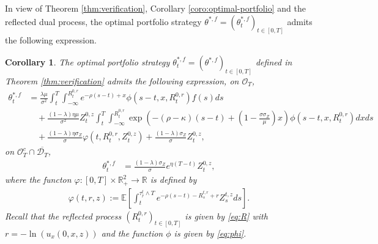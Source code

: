 \documentclass[11pt,times,letter]{article}
\newcommand{\Ex}{ \mathbb{E} }
\newcommand{\R}{\mathds{R}}
\numberwithin{equation}{section}
\newtheorem{corollary}[theorem]{Corollary}
\begin{document}
In view of Theorem \ref{thm:verification}, Corollary \ref{coro:optimal-portfolio} and the reflected dual process, the optimal portfolio strategy $\theta^{*,f}=(\theta_t^{*,f})_{t\in[0,T]}$  admits the following expression.
\begin{corollary}\label{coro:optimal-portfolio-dual}
The optimal portfolio strategy $\theta_t^{*,f}=(\theta^{*,f})_{t\in[0,T]}$ defined in Theorem \ref{thm:verification} admits the following expression,  on $\mathcal{O}_T$,
\begin{align}\label{optimal-portfolio-daul-O}
\theta^{*,f}_t&=\frac{\lambda \mu}{\sigma^2} \int_{t}^{T}\int_{-\infty}^{R_t^{0,r}} e^{-\rho (s-t)+x}\phi(s-t,x,R_t^{0,r})f(s) ds\nonumber\\
&\quad+\frac{(1-\lambda)\eta \mu}{\sigma^2} Z_t^{0,z}\int_{t}^{T}\int_{-\infty}^{R_t^{0,r}} \exp\left(-(\rho-\kappa)(s-t)+\left(1-\frac{\sigma\sigma_Z}{\mu}\right)x\right) \phi(s-t,x,R_t^{0,r})dx ds\nonumber\\
&\quad+\frac{(1-\lambda)\eta\sigma_Z}{\sigma}  \varphi(t,R_t^{0,r},Z_t^{0,z})+\frac{(1-\lambda)\sigma_Z}{\sigma}Z_t^{0,z},
\end{align} 
on $\mathcal{O}_T^c \cap \overline{\mathcal{D}_T}$,
\begin{align}\label{optimal-portfolio-dual-Oc}
\theta^{*,f}_t&=\frac{(1-\lambda)\sigma_Z}{\sigma}e^{\eta (T-t)}Z_t^{0,z},
\end{align}
where the functon $\varphi:[0,T]\times \R_+^2\to \R$ is defined by
\begin{align}\label{eq:varphi}
\varphi(t,r,z):=\Ex\left[ \int_t^{\tau_{\hat{r}}^t \wedge T}e^{-\rho (s-t)-R^{t,r}_s+r}Z_s^{t,z} ds\right].
\end{align}
Recall that the reflected process $(R_t^{0,r})_{t\in [0,T]}$ is given by \eqref{eq:R} with $r=-\ln(u_x(0,x,z))$ and the function $\phi$ is given by \eqref{eq:phi}.
\end{corollary}
\end{document}
